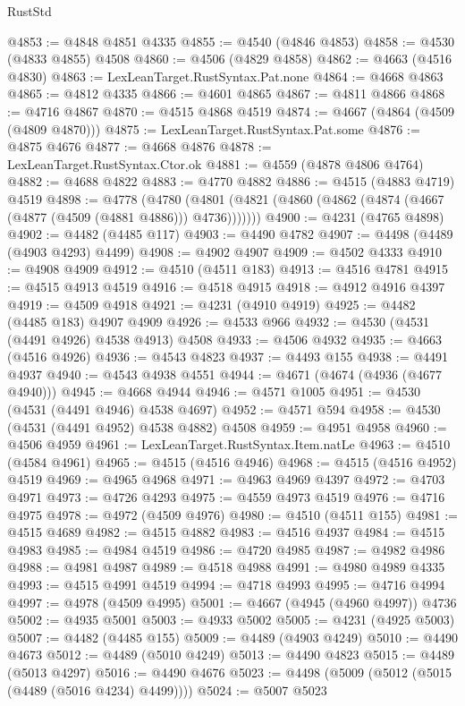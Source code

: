 \begin{lexlean}{RustStd}
\begin{coremodule}
@4853 := @4848 @4851 @4335
@4855 := @4540 (@4846 @4853)
@4858 := @4530 (@4833 @4855) @4508
@4860 := @4506 (@4829 @4858)
@4862 := @4663 (@4516 @4830)
@4863 := LexLeanTarget.RustSyntax.Pat.none
@4864 := @4668 @4863
@4865 := @4812 @4335
@4866 := @4601 @4865
@4867 := @4811 @4866
@4868 := @4716 @4867
@4870 := @4515 @4868 @4519
@4874 := @4667 (@4864 (@4509 (@4809 @4870)))
@4875 := LexLeanTarget.RustSyntax.Pat.some
@4876 := @4875 @4676
@4877 := @4668 @4876
@4878 := LexLeanTarget.RustSyntax.Ctor.ok
@4881 := @4559 (@4878 @4806 @4764)
@4882 := @4688 @4822
@4883 := @4770 @4882
@4886 := @4515 (@4883 @4719) @4519
@4898 := @4778
    (@4780 (@4801 (@4821 (@4860 (@4862 (@4874 (@4667 (@4877 (@4509 (@4881 @4886))) @4736)))))))
@4900 := @4231 (@4765 @4898)
@4902 := @4482 (@4485 @117)
@4903 := @4490 @4782
@4907 := @4498 (@4489 (@4903 @4293) @4499)
@4908 := @4902 @4907
@4909 := @4502 @4333
@4910 := @4908 @4909
@4912 := @4510 (@4511 @183)
@4913 := @4516 @4781
@4915 := @4515 @4913 @4519
@4916 := @4518 @4915
@4918 := @4912 @4916 @4397
@4919 := @4509 @4918
@4921 := @4231 (@4910 @4919)
@4925 := @4482 (@4485 @183) @4907 @4909
@4926 := @4533 @966
@4932 := @4530 (@4531 (@4491 @4926) @4538 @4913) @4508
@4933 := @4506 @4932
@4935 := @4663 (@4516 @4926)
@4936 := @4543 @4823
@4937 := @4493 @155
@4938 := @4491 @4937
@4940 := @4543 @4938 @4551
@4944 := @4671 (@4674 (@4936 (@4677 @4940)))
@4945 := @4668 @4944
@4946 := @4571 @1005
@4951 := @4530 (@4531 (@4491 @4946) @4538 @4697)
@4952 := @4571 @594
@4958 := @4530 (@4531 (@4491 @4952) @4538 @4882) @4508
@4959 := @4951 @4958
@4960 := @4506 @4959
@4961 := LexLeanTarget.RustSyntax.Item.natLe
@4963 := @4510 (@4584 @4961)
@4965 := @4515 (@4516 @4946)
@4968 := @4515 (@4516 @4952) @4519
@4969 := @4965 @4968
@4971 := @4963 @4969 @4397
@4972 := @4703 @4971
@4973 := @4726 @4293
@4975 := @4559 @4973 @4519
@4976 := @4716 @4975
@4978 := @4972 (@4509 @4976)
@4980 := @4510 (@4511 @155)
@4981 := @4515 @4689
@4982 := @4515 @4882
@4983 := @4516 @4937
@4984 := @4515 @4983
@4985 := @4984 @4519
@4986 := @4720 @4985
@4987 := @4982 @4986
@4988 := @4981 @4987
@4989 := @4518 @4988
@4991 := @4980 @4989 @4335
@4993 := @4515 @4991 @4519
@4994 := @4718 @4993
@4995 := @4716 @4994
@4997 := @4978 (@4509 @4995)
@5001 := @4667 (@4945 (@4960 @4997)) @4736
@5002 := @4935 @5001
@5003 := @4933 @5002
@5005 := @4231 (@4925 @5003)
@5007 := @4482 (@4485 @155)
@5009 := @4489 (@4903 @4249)
@5010 := @4490 @4673
@5012 := @4489 (@5010 @4249)
@5013 := @4490 @4823
@5015 := @4489 (@5013 @4297)
@5016 := @4490 @4676
@5023 := @4498 (@5009 (@5012 (@5015 (@4489 (@5016 @4234) @4499))))
@5024 := @5007 @5023

\end{coremodule}
\end{lexlean}
